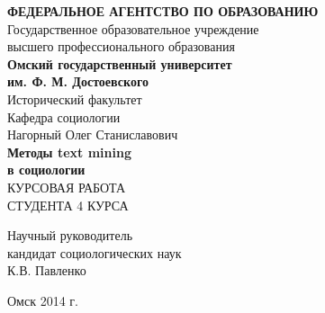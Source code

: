 \begin{titlepage}

\begin{center}
{\bf ФЕДЕРАЛЬНОЕ АГЕНТСТВО ПО ОБРАЗОВАНИЮ}\\
\vspace{0.5cm}
Государственное образовательное учреждение\\
высшего профессионального образования\\
\textbf{Омский государственный университет\\
им. Ф. М. Достоевского\\}
\vspace{0.5cm}
Исторический факультет\\
Кафедра социологии\\
\vspace{3cm}
Нагорный Олег Станиславович\\
\vspace{1cm}
\textbf{\large Методы text mining\\в социологии\\}
\vspace{2cm}
КУРСОВАЯ РАБОТА\\
СТУДЕНТА 4 КУРСА\\
\vspace{2cm}
\end{center}

\begin{flushright}
Научный руководитель\\
кандидат социологических наук\\
К.В. Павленко\\
                                               
\vspace{4cm}

\begin{center}
Омск 2014 г.
\end{center}

\end{flushright}
\end{titlepage}